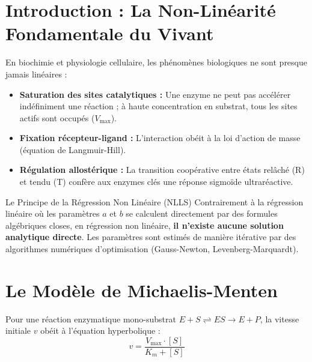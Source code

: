 \documentclass[11pt,a4paper]{article}
\begin{document}

\section{Introduction : La Non-Linéarité Fondamentale du Vivant}

En biochimie et physiologie cellulaire, les phénomènes biologiques ne sont presque jamais linéaires :
\begin{itemize}[leftmargin=*, label=\faAngleRight]
  \item \textbf{Saturation des sites catalytiques :} Une enzyme ne peut pas accélérer indéfiniment une réaction ; à haute concentration en substrat, tous les sites actifs sont occupés ($V_{\max}$).
  \item \textbf{Fixation récepteur-ligand :} L'interaction obéit à la loi d'action de masse (équation de Langmuir-Hill).
  \item \textbf{Régulation allostérique :} La transition coopérative entre états relâché (R) et tendu (T) confère aux enzymes clés une réponse sigmoïde ultraréactive.
\end{itemize}

\begin{conceptbox}{Le Principe de la Régression Non Linéaire (NLLS)}
Contrairement à la régression linéaire où les paramètres $a$ et $b$ se calculent directement par des formules algébriques closes, en régression non linéaire, \textbf{il n'existe aucune solution analytique directe}. Les paramètres sont estimés de manière itérative par des algorithmes numériques d'optimisation (Gauss-Newton, Levenberg-Marquardt).
\end{conceptbox}

\section{Le Modèle de Michaelis-Menten}

Pour une réaction enzymatique mono-substrat $E + S \rightleftharpoons ES \rightarrow E + P$, la vitesse initiale $v$ obéit à l'équation hyperbolique :
\begin{equation*}
  v = \frac{V_{\max} \cdot [S]}{K_m + [S]}
\end{equation*}
\end{document}
